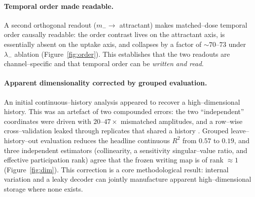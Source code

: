 \documentclass[11pt]{article}
\begin{document}
\paragraph{Temporal order made readable.} A second orthogonal readout ($m_-\!\to$ attractant) makes matched--dose
temporal order causally readable: the order contrast lives on the attractant axis, is essentially absent on the
uptake axis, and collapses by a factor of $\sim$$70$--$73$ under $\lambda_-$ ablation (Figure~\ref{fig:order}). This
establishes that the two readouts are channel--specific and that temporal order can be \emph{written and read}.

\paragraph{Apparent dimensionality corrected by grouped evaluation.} An initial continuous--history analysis
appeared to recover a high--dimensional history. This was an artefact of two compounded errors: the two ``independent''
coordinates were driven with $20$--$47\times$ mismatched amplitudes, and a row--wise cross--validation leaked
through replicates that shared a history \citep{kaufman2012}. Grouped leave--history--out evaluation reduces the
headline continuous $R^2$ from $0.57$ to $0.19$, and three independent estimators (collinearity, a
sensitivity singular--value ratio, and effective participation rank) agree that the frozen writing map is of rank
$\approx1$ (Figure~\ref{fig:dim}). This correction is a core methodological result: internal variation and a leaky
decoder can jointly manufacture apparent high--dimensional storage where none exists.
\end{document}
